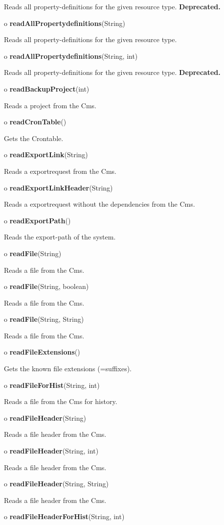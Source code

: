 \begin{description}
Reads all property-definitions for the given resource type. {\bf Deprecated.} 

\item o {\bf readAllPropertydefinitions}(String)  

Reads all property-definitions for the given resource type.  
\item o {\bf readAllPropertydefinitions}(String, int)  

Reads all property-definitions for the given resource type. {\bf Deprecated.} 

\item o {\bf readBackupProject}(int)  

Reads a project from the Cms.  
\item o {\bf readCronTable}()  

Gets the Crontable.  
\item o {\bf readExportLink}(String)  

Reads a exportrequest from the Cms.  
\item o {\bf readExportLinkHeader}(String)  

Reads a exportrequest without the dependencies from the Cms.  
\item o {\bf readExportPath}()  

Reads the export-path of the system.  
\item o {\bf readFile}(String)  

Reads a file from the Cms.  
\item o {\bf readFile}(String, boolean)  

Reads a file from the Cms.  
\item o {\bf readFile}(String, String)  

Reads a file from the Cms.  
\item o {\bf readFileExtensions}()  

Gets the known file extensions (=suffixes).  
\item o {\bf readFileForHist}(String, int)  

Reads a file from the Cms for history.  
\item o {\bf readFileHeader}(String)  

Reads a file header from the Cms.  
\item o {\bf readFileHeader}(String, int)  

Reads a file header from the Cms.  
\item o {\bf readFileHeader}(String, String)  

Reads a file header from the Cms.  
\item o {\bf readFileHeaderForHist}(String, int)  


\end{description}
